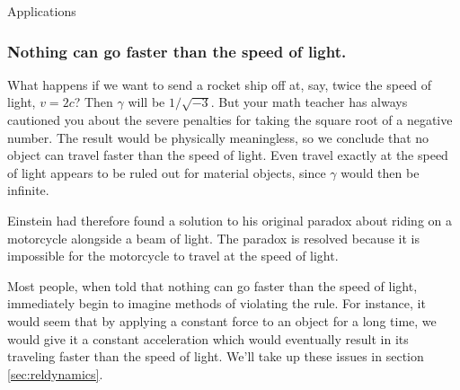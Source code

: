 \begin{envsubsection}{Applications}
\subsubsection{Nothing can go faster than the speed of light.}
What happens if we want to send a rocket ship off
at, say, twice the speed of light, $v=2c$? Then $\gamma$ will be 
$1/\sqrt{-3}$. But
your math teacher has always cautioned you about the severe
penalties for taking the square root of a negative number.
The result would be physically meaningless, so we conclude
that no object can travel faster than the speed of light.
Even travel exactly at the speed of light appears to be
ruled out for material objects, since $\gamma$ would then be
infinite.

Einstein had therefore found a solution to his original
paradox about riding on a motorcycle alongside a beam of
light. The paradox is resolved because it is
impossible for the motorcycle to travel at the speed of
light.


Most people, when told that nothing can go faster than the
speed of light, immediately begin to imagine methods of
violating the rule. For instance, it would seem that by
applying a constant force to an object for a long time, we
would give it a constant acceleration which would eventually
result in its traveling faster than the speed of light. 
We'll take up these issues in section \ref{sec:reldynamics}.


\end{envsubsection}
